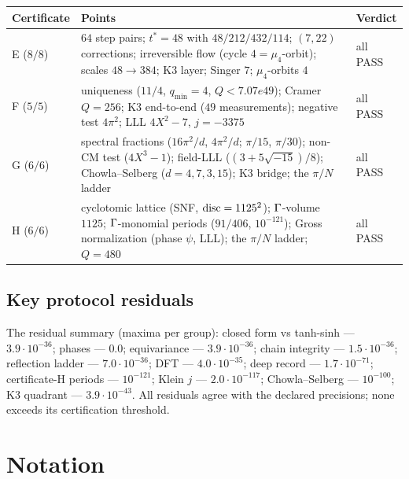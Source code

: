 \begin{center}
\small
\begin{tabular}{@{}l l l@{}}
\toprule
Certificate & Points & Verdict \\
\midrule
E ($8/8$) & $64$ step pairs; $t^*=48$ with $48/212/432/114$;
  $(7,22)$ corrections; irreversible flow (cycle $4=\mu_4$-orbit);
  scales $48\to384$; K3 layer; Singer $7$; $\mu_4$-orbits $4$ &
  all PASS \\
F ($5/5$) & uniqueness ($11/4$, $q_{\min}=4$, $Q<7.07e49$); Cramer
  $Q=256$; K3 end-to-end ($49$ measurements); negative test
  $4\pi^2$; LLL $4X^2-7$, $j=-3375$ & all PASS \\
G ($6/6$) & spectral fractions ($16\pi^2/d$, $4\pi^2/d$;
  $\pi/15$, $\pi/30$); non-CM test ($4X^3-1$); field-LLL
  ($(3+5\sqrt{-15})/8$); Chowla--Selberg ($d=4,7,3,15$); K3 bridge;
  the $\pi/N$ ladder & all PASS \\
H ($6/6$) & cyclotomic lattice (SNF, $\operatorname{disc}=1125^2$);
  $\Gamma$-volume $1125$; $\Gamma$-monomial periods ($91/406$,
  $10^{-121}$); Gross normalization (phase $\psi$, LLL); the
  $\pi/N$ ladder; $Q=480$ & all PASS \\
\bottomrule
\end{tabular}
\end{center}

\subsection{Key protocol residuals}

The residual summary (maxima per group): closed form vs tanh-sinh
--- $3.9\cdot10^{-36}$; phases --- $0.0$; equivariance ---
$3.9\cdot10^{-36}$; chain integrity --- $1.5\cdot10^{-36}$;
reflection ladder --- $7.0\cdot10^{-36}$; DFT --- $4.0\cdot10^{-35}$;
deep record --- $1.7\cdot10^{-71}$; certificate-H periods ---
$10^{-121}$; Klein $j$ --- $2.0\cdot10^{-117}$; Chowla--Selberg ---
$10^{-100}$; K3 quadrant --- $3.9\cdot10^{-43}$. All residuals agree
with the declared precisions; none exceeds its certification
threshold.

\section{Notation}\label{app:notation}


